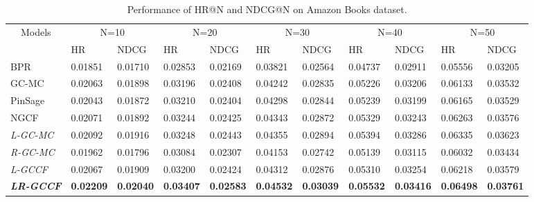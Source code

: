 \documentclass[letterpaper]{article} %
\begin{document}
\begin{small}
\begin{table}[h]
\footnotesize
\centering
\caption{Performance of HR@N and NDCG@N on Amazon Books dataset. }\label{tab:resAmazon}
\begin{tabular}{|l|l|l|l|l|l|l|l|l|l|l|}
\hline
\multicolumn{1}{|c|}{\multirow{2}{*}{Models}} & \multicolumn{2}{c|}{N=10} & \multicolumn{2}{c|}{N=20} & \multicolumn{2}{c|}{N=30} & \multicolumn{2}{c|}{N=40} & \multicolumn{2}{c|}{N=50} \\ \cline{2-11}
\multicolumn{1}{|c|}{} & HR & NDCG & HR & NDCG & HR & NDCG & HR & NDCG & HR & NDCG \\ \hline
BPR & 0.01851 & 0.01710 & 0.02853 & 0.02169 & 0.03821 & 0.02564 & 0.04737 & 0.02911 & 0.05556 & 0.03205 \\ \hline
GC-MC & 0.02063 & 0.01898 & 0.03196 & 0.02408 & 0.04242 & 0.02835 & 0.05226 & 0.03206 & 0.06133 & 0.03532 \\ \hline
PinSage & 0.02043 & 0.01872 & 0.03210 & 0.02404 & 0.04298 & 0.02844 & 0.05239 & 0.03199 & 0.06165 & 0.03529 \\ \hline
NGCF & 0.02071 & 0.01892 & 0.03244 & 0.02425 & 0.04343 & 0.02872 & 0.05329 & 0.03243 & 0.06263 & 0.03576 \\ \hline
\emph{L-GC-MC} & 0.02092 & 0.01916 & 0.03248 & 0.02443 & 0.04355 & 0.02894 & 0.05394 & 0.03286 & 0.06335 & 0.03623 \\ \hline
\emph{R-GC-MC} & 0.01962 & 0.01796 & 0.03084 & 0.02307 & 0.04153 & 0.02742 & 0.05139 & 0.03115 & 0.06032 & 0.03434 \\ \hline
\emph{L-GCCF} &0.02067 &0.01909 &0.03200 &0.02424 &0.04312 &0.02876 &0.05310 &0.03254 &0.06218 &0.03579  \\ \hline
\emph{\textbf{LR-GCCF}} & \textbf{0.02209} & \textbf{0.02040} & \textbf{0.03407} & \textbf{0.02583} & \textbf{0.04532} & \textbf{0.03039} & \textbf{0.05532} & \textbf{0.03416} & \textbf{0.06498} & \textbf{0.03761} \\ \hline
\end{tabular}
\end{table}
\end{small}
\end{document}
